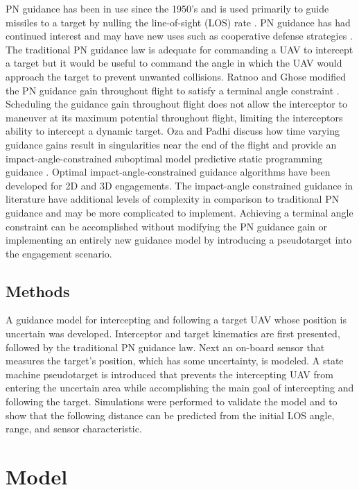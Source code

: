 \documentclass[conference]{IEEEtran}
\begin{document}
PN guidance has been in use since the 1950's \cite{zarchan} and is used primarily to guide missiles to a target by nulling the line-of-sight (LOS) rate \cite{shneydor1998missile,yanushevsky2007modern}. PN guidance has had continued interest and may have new uses such as cooperative defense strategies \cite{isaac}. The traditional PN guidance law is adequate for commanding a UAV to intercept a target but it would be useful to command the angle in which the UAV would approach the target to prevent unwanted collisions. Ratnoo and Ghose modified the PN guidance gain throughout flight to satisfy a terminal angle constraint \cite{ratnoo2009satisfying}. Scheduling the guidance gain throughout flight does not allow the interceptor to maneuver at its maximum potential throughout flight, limiting the interceptors ability to intercept a dynamic target. Oza and Padhi discuss how time varying guidance gains result in singularities near the end of the flight and provide an impact-angle-constrained suboptimal model predictive static programming guidance \cite{oza2012impact}. Optimal impact-angle-constrained guidance algorithms have been developed for 2D \cite{park2013optimal} and 3D \cite{kumar2014three} engagements. The impact-angle constrained guidance in literature have additional levels of complexity in comparison to traditional PN guidance and may be more complicated to implement. Achieving a terminal angle constraint can be accomplished without modifying the PN guidance gain or implementing an entirely new guidance model by introducing a pseudotarget into the engagement scenario.

\subsection{Methods}
A guidance model for intercepting and following a target UAV whose position is uncertain was developed. Interceptor and target kinematics are first presented, followed by the traditional PN guidance law. Next an on-board sensor that measures the target's position, which has some uncertainty, is modeled. A state machine pseudotarget is introduced that prevents the intercepting UAV from entering the uncertain area while accomplishing the main goal of intercepting and following the target. Simulations were performed to validate the model and to show that the following distance can be predicted from the initial LOS angle, range, and sensor characteristic.

\section{Model}
\end{document}
